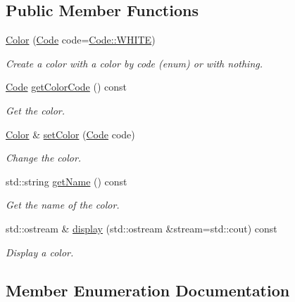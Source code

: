 \subsection*{Public Member Functions}
\begin{DoxyCompactItemize}
\item 
\hyperlink{classColor_a92af25a903c2c1ba3bca81dd040beda2}{Color} (\hyperlink{classColor_a20a7b04657c1d83fae5d54514d3f1622}{Code} code=\hyperlink{classColor_a20a7b04657c1d83fae5d54514d3f1622ab5bf627e448384cf3a4c35121ca6008d}{Code\+::\+W\+H\+I\+TE})
\begin{DoxyCompactList}\small\item\em Create a color with a color by code (enum) or with nothing. \end{DoxyCompactList}\item 
\hyperlink{classColor_a20a7b04657c1d83fae5d54514d3f1622}{Code} \hyperlink{classColor_ab96d8cb3ac1a67ec7c9742275e6c21d4}{get\+Color\+Code} () const
\begin{DoxyCompactList}\small\item\em Get the color. \end{DoxyCompactList}\item 
\hyperlink{classColor}{Color} \& \hyperlink{classColor_ac8b95bf17259268c7b8bd529474be47e}{set\+Color} (\hyperlink{classColor_a20a7b04657c1d83fae5d54514d3f1622}{Code} code)
\begin{DoxyCompactList}\small\item\em Change the color. \end{DoxyCompactList}\item 
std\+::string \hyperlink{classColor_ad12970fef3d1a60a450a9e3cee1057fb}{get\+Name} () const
\begin{DoxyCompactList}\small\item\em Get the name of the color. \end{DoxyCompactList}\item 
std\+::ostream \& \hyperlink{classColor_a5e25f1f4beacb681574dc8387c392890}{display} (std\+::ostream \&stream=std\+::cout) const
\begin{DoxyCompactList}\small\item\em Display a color. \end{DoxyCompactList}\end{DoxyCompactItemize}


\subsection{Member Enumeration Documentation}
\mbox{\label{classColor_a20a7b04657c1d83fae5d54514d3f1622}} 
